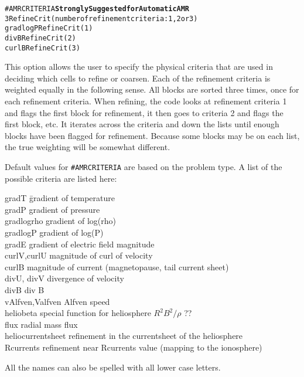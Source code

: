 \begin{alltt}
#AMRCRITERIA      \hfill {\bf Strongly Suggested for Automatic AMR}
3                      RefineCrit (number of refinement criteria: 1,2 or 3)
gradlogP               RefineCrit(1)
divB                   RefineCrit(2)
curlB                  RefineCrit(3)
\end{alltt}

This option allows the user to specify the physical criteria 
that are used in deciding which cells to refine or coarsen.  Each 
of the refinement criteria is weighted equally in the following sense.
All blocks are sorted three times, once for each 
refinement criteria.  When refining, the code looks at 
refinement criteria 1 and flags the first block for refinement,
it then  goes to criteria 2 and flags the first block, etc.
It iterates across  the criteria and down the lists until enough blocks
have been flagged for refinement.  Because
some blocks may be on each list, the true weighting will be somewhat 
different.

Default values for {\tt \#AMRCRITERIA} are based on the problem
type.  A list of the possible criteria are listed here:
\begin{tabbing}
gradT \hspace{1.0in} \= gradient of temperature \\
gradP           \> gradient of pressure \\
gradlogrho	\> gradient of log(rho) \\
gradlogP	\> gradient of log(P) \\
gradE		\> gradient of electric field magnitude \\
curlV,curlU 	\> magnitude of curl of velocity \\
curlB		\> magnitude of current  (magnetopause, tail current sheet)\\
divU, divV	\> divergence of velocity \\
divB		\> div B \\
vAlfven,Valfven	\> Alfven speed \\
heliobeta       \> special function for heliosphere $R^2B^2/\rho$ ?? \\
flux		\> radial mass flux \\
heliocurrentsheet \> refinement in the currentsheet of the heliosphere \\
Rcurrents	\>refinement near Rcurrents value (mapping to the ionosphere)
\end{tabbing}
All the names can also be spelled with all lower case letters.
\ \ \\

